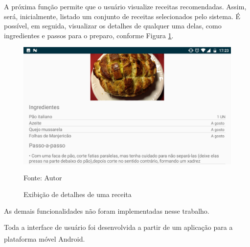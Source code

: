 A próxima função permite que o usuário visualize receitas recomendadas. Assim, será, inicialmente, listado um conjunto de receitas selecionados pelo sistema. É possível, em seguida, visualizar os detalhes de qualquer uma delas, como ingredientes e passos para o preparo, conforme Figura \ref{fig:cap4_exibicao_receita}.

\begin{figure}[htb]
    \caption{Exibição de detalhes de uma receita}
    \label{fig:cap4_exibicao_receita}
    \includegraphics[width=\textwidth]{figuras/cap4_exibicao_receita.png}
    
   \footnotesize{Fonte: Autor}
\end{figure}

As demais funcionalidades não foram implementadas nesse trabalho.

Toda a interface de usuário foi desenvolvida a partir de um aplicação para a plataforma móvel Android\textsuperscript{\textregistered}.




